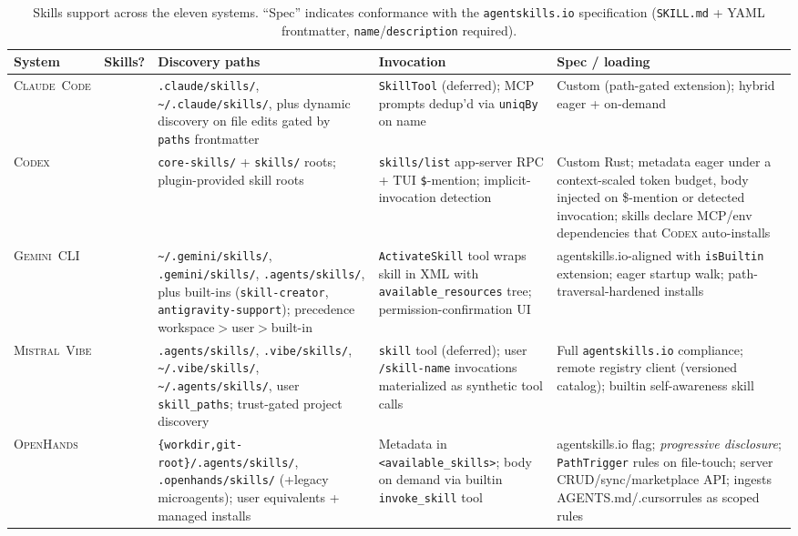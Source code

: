 \documentclass[11pt,a4paper]{article}
\newcommand{\clcode}{\textsc{Claude~Code}\xspace}
\newcommand{\cdx}{\textsc{Codex}\xspace}
\newcommand{\oh}{\textsc{OpenHands}\xspace}
\newcommand{\vibe}{\textsc{Mistral~Vibe}\xspace}
\newcommand{\gemini}{\textsc{Gemini~CLI}\xspace}
\newcommand{\cmark}{\ding{51}}
\begin{document}
\begin{table}[H]
\centering
\caption{Skills support across the eleven systems. ``Spec'' indicates conformance with the \texttt{agentskills.io} specification (\texttt{SKILL.md} + YAML frontmatter, \texttt{name}/\texttt{description} required).}
\label{tab:skills}
\scriptsize
\renewcommand{\arraystretch}{1.25}
\setlength{\tabcolsep}{3.5pt}
\begin{tabularx}{\textwidth}{@{}l c L{4.2cm} L{3.0cm} L{4.2cm}@{}}
\toprule
\textbf{System} & \textbf{Skills?} & \textbf{Discovery paths} & \textbf{Invocation} & \textbf{Spec / loading} \\
\midrule
\clcode{} & \cmark & \texttt{.claude/skills/}, \texttt{\textasciitilde/.claude/skills/}, plus dynamic discovery on file edits gated by \texttt{paths} frontmatter & \texttt{SkillTool} (deferred); MCP prompts dedup'd via \texttt{uniqBy} on name & Custom (path-gated extension); hybrid eager + on-demand \\
\cdx{}    & \cmark & \texttt{core-skills/} + \texttt{skills/} roots; plugin-provided skill roots & \texttt{skills/list} app-server RPC + TUI \texttt{\$}-mention; implicit-invocation detection & Custom Rust; metadata eager under a context-scaled token budget, body injected on \$-mention or detected invocation; skills declare MCP/env dependencies that \cdx{} auto-installs \\
\gemini{} & \cmark & \texttt{\textasciitilde/.gemini/skills/}, \texttt{.gemini/skills/}, \texttt{.agents/skills/}, plus built-ins (\texttt{skill-creator}, \texttt{antigravity-support}); precedence workspace$>$user$>$built-in & \texttt{ActivateSkill} tool wraps skill in XML with \texttt{available\_resources} tree; permission-confirmation UI & agentskills.io-aligned with \texttt{isBuiltin} extension; eager startup walk; path-traversal-hardened installs \\
\vibe{}   & \cmark & \texttt{.agents/skills/}, \texttt{.vibe/skills/}, \texttt{\textasciitilde/.vibe/skills/}, \texttt{\textasciitilde/.agents/skills/}, user \texttt{skill\_paths}; trust-gated project discovery & \texttt{skill} tool (deferred); user \texttt{/skill-name} invocations materialized as synthetic tool calls & Full \texttt{agentskills.io} compliance; remote registry client (versioned catalog); builtin self-awareness skill \\
\oh{}     & \cmark & \texttt{\{workdir,git-root\}/.agents/skills/}, \texttt{.openhands/skills/} (+legacy microagents); user equivalents + managed installs & Metadata in \texttt{<available\_skills>}; body on demand via builtin \texttt{invoke\_skill} tool & agentskills.io flag; \emph{progressive disclosure}; \texttt{PathTrigger} rules on file-touch; server CRUD/sync/marketplace API; ingests AGENTS.md/.cursorrules as scoped rules \\

\end{tabularx}
\end{table}
\end{document}
